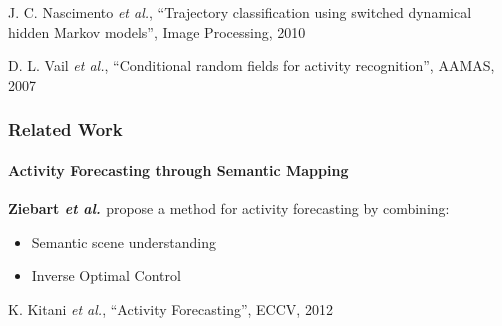 \begin{frame}
	\vspace{0.47cm}
	
	\tiny
	
	\cite{Nascimento10} J. C. Nascimento \emph{et al.}, ``Trajectory classification using switched
	dynamical hidden Markov models'', Image Processing, 2010
	
	\vspace{-0.17cm}
	
	\cite{Vail07} D. L. Vail \emph{et al.}, ``Conditional random fields for activity recognition'',
	AAMAS, 2007
\end{frame}

\begin{frame}
	\frametitle{Related Work}
	\framesubtitle{Activity Forecasting through Semantic Mapping}
	
	\vspace{0.33cm}
	
	\large
	
	\textbf{Ziebart \emph{et al.} \cite{Kitani12}} propose a method for activity forecasting by
	combining:
	
	\begin{itemize}
		\item Semantic scene understanding
		\vspace{0.05cm}
		\item Inverse Optimal Control
	\end{itemize}
	
	\vspace{-0.2cm}
	
	\begin{center}
	\end{center}
	
	\vspace{-0.3cm}
	
	\tiny
	
	\cite{Kitani12} K. Kitani \emph{et al.}, ``Activity Forecasting'', ECCV, 2012
\end{frame}


